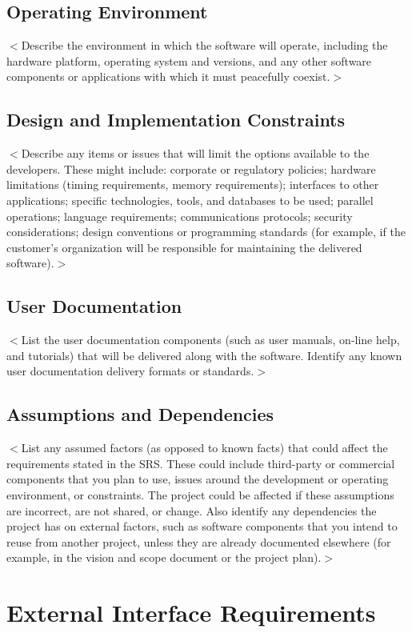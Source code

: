 \documentclass{scrreprt}
\begin{document}
\section{Operating Environment}
$<$Describe the environment in which the software will operate, including the 
hardware platform, operating system and versions, and any other software 
components or applications with which it must peacefully coexist.$>$

\section{Design and Implementation Constraints}
$<$Describe any items or issues that will limit the options available to the 
developers. These might include: corporate or regulatory policies; hardware 
limitations (timing requirements, memory requirements); interfaces to other 
applications; specific technologies, tools, and databases to be used; parallel 
operations; language requirements; communications protocols; security 
considerations; design conventions or programming standards (for example, if the 
customer’s organization will be responsible for maintaining the delivered 
software).$>$

\section{User Documentation}
$<$List the user documentation components (such as user manuals, on-line help, 
and tutorials) that will be delivered along with the software. Identify any 
known user documentation delivery formats or standards.$>$
\section{Assumptions and Dependencies}

$<$List any assumed factors (as opposed to known facts) that could affect the 
requirements stated in the SRS. These could include third-party or commercial 
components that you plan to use, issues around the development or operating 
environment, or constraints. The project could be affected if these assumptions 
are incorrect, are not shared, or change. Also identify any dependencies the 
project has on external factors, such as software components that you intend to 
reuse from another project, unless they are already documented elsewhere (for 
example, in the vision and scope document or the project plan).$>$


\chapter{External Interface Requirements}
\end{document}
